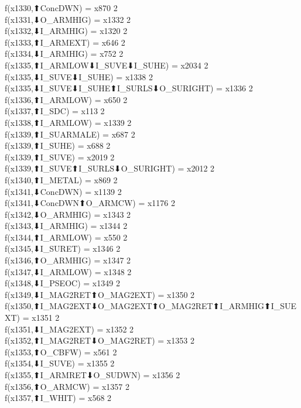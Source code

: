 f(x1330,⬆ConcDWN) = x870 {2} \\
f(x1331,⬇O_ARMHIG) = x1332 {2} \\
f(x1332,⬇I_ARMHIG) = x1320 {2} \\
f(x1333,⬆I_ARMEXT) = x646 {2} \\
f(x1334,⬇I_ARMHIG) = x752 {2} \\
f(x1335,⬆I_ARMLOW⬇I_SUVE⬇I_SUHE) = x2034 {2} \\
f(x1335,⬇I_SUVE⬇I_SUHE) = x1338 {2} \\
f(x1335,⬇I_SUVE⬇I_SUHE⬆I_SURLS⬇O_SURIGHT) = x1336 {2} \\
f(x1336,⬆I_ARMLOW) = x650 {2} \\
f(x1337,⬆I_SDC) = x113 {2} \\
f(x1338,⬆I_ARMLOW) = x1339 {2} \\
f(x1339,⬆I_SUARMALE) = x687 {2} \\
f(x1339,⬆I_SUHE) = x688 {2} \\
f(x1339,⬆I_SUVE) = x2019 {2} \\
f(x1339,⬆I_SUVE⬆I_SURLS⬇O_SURIGHT) = x2012 {2} \\
f(x1340,⬆I_METAL) = x869 {2} \\
f(x1341,⬇ConcDWN) = x1139 {2} \\
f(x1341,⬇ConcDWN⬆O_ARMCW) = x1176 {2} \\
f(x1342,⬇O_ARMHIG) = x1343 {2} \\
f(x1343,⬇I_ARMHIG) = x1344 {2} \\
f(x1344,⬆I_ARMLOW) = x550 {2} \\
f(x1345,⬇I_SURET) = x1346 {2} \\
f(x1346,⬆O_ARMHIG) = x1347 {2} \\
f(x1347,⬇I_ARMLOW) = x1348 {2} \\
f(x1348,⬇I_PSEOC) = x1349 {2} \\
f(x1349,⬇I_MAG2RET⬆O_MAG2EXT) = x1350 {2} \\
f(x1350,⬆I_MAG2EXT⬇O_MAG2EXT⬆O_MAG2RET⬆I_ARMHIG⬆I_SUEXT) = x1351 {2} \\
f(x1351,⬇I_MAG2EXT) = x1352 {2} \\
f(x1352,⬆I_MAG2RET⬇O_MAG2RET) = x1353 {2} \\
f(x1353,⬆O_CBFW) = x561 {2} \\
f(x1354,⬇I_SUVE) = x1355 {2} \\
f(x1355,⬆I_ARMRET⬇O_SUDWN) = x1356 {2} \\
f(x1356,⬆O_ARMCW) = x1357 {2} \\
f(x1357,⬆I_WHIT) = x568 {2} \\
